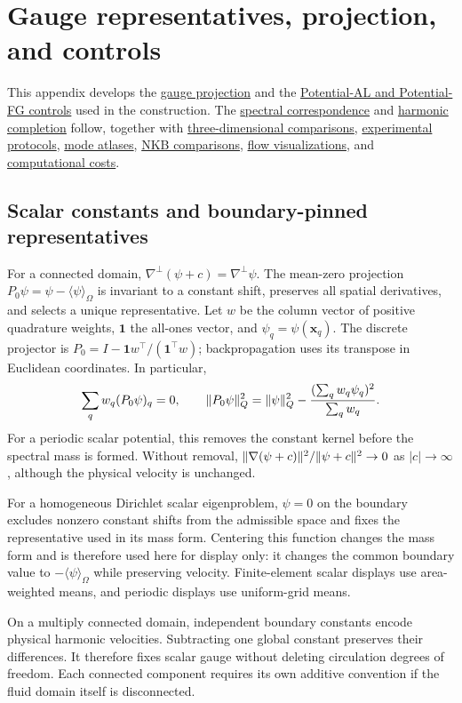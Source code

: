 \section{Gauge representatives, projection, and controls}
\label{app:theory}
This appendix develops the \hyperref[app:vector-gauge]{gauge projection} and the \hyperref[app:old-Pot]{Potential-AL and Potential-FG controls} used in the construction. The \hyperref[app:spectrum]{spectral correspondence} and \hyperref[app:topology-rom]{harmonic completion} follow, together with \hyperref[app:3d-controls]{three-dimensional comparisons}, \hyperref[app:protocol]{experimental protocols}, \hyperref[app:modes]{mode atlases}, \hyperref[app:nkb]{NKB comparisons}, \hyperref[app:fields]{flow visualizations}, and \hyperref[app:runtime]{computational costs}.

\subsection{Scalar constants and boundary-pinned representatives}
\label{app:scalar}
For a connected domain, $\nabla^\perp(\psi+c)=\nabla^\perp\psi$. The mean-zero projection $P_0\psi=\psi-\langle\psi\rangle_\Omega$ is invariant to a constant shift, preserves all spatial derivatives, and selects a unique representative. Let $w$ be the column vector of positive quadrature weights, $\mathbf1$ the all-ones vector, and $\psi_q=\psi(\mathbf x_q)$. The discrete projector is $P_0=I-\mathbf1 w^{\top}/(\mathbf1^{\top}w)$; backpropagation uses its transpose in Euclidean coordinates. In particular,
\[
\sum_q w_q(P_0\psi)_q=0,\qquad
\lVert P_0\psi\rVert_Q^2=\lVert \psi\rVert_Q^2-\frac{(\sum_qw_q\psi_q)^2}{\sum_qw_q}.
\]
For a periodic scalar potential, this removes the constant kernel before the spectral mass is formed. Without removal, $\lVert \nabla(\psi+c)\rVert^2/\lVert \psi+c\rVert^2\to0$ as $|c|\to\infty$, although the physical velocity is unchanged.

For a homogeneous Dirichlet scalar eigenproblem, $\psi=0$ on the boundary excludes nonzero constant shifts from the admissible space and fixes the representative used in its mass form. Centering this function changes the mass form and is therefore used here for display only: it changes the common boundary value to $-\langle\psi\rangle_\Omega$ while preserving velocity. Finite-element scalar displays use area-weighted means, and periodic displays use uniform-grid means.

On a multiply connected domain, independent boundary constants encode physical harmonic velocities. Subtracting one global constant preserves their differences. It therefore fixes scalar gauge without deleting circulation degrees of freedom. Each connected component requires its own additive convention if the fluid domain itself is disconnected.

